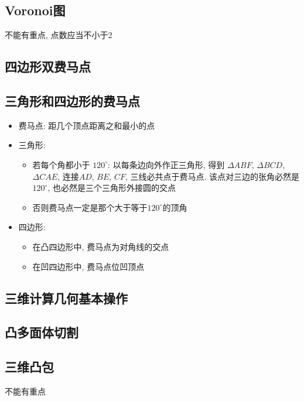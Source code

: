 \documentclass[landscape, twocolumn, 8pt, a4paper, twoside]{extarticle}
\begin{document}
  \subsection{Voronoi图}
  不能有重点, 点数应当不小于2
  

  \subsection{四边形双费马点}
  

  \subsection{三角形和四边形的费马点}
  \begin{itemize}
  \item 费马点: 距几个顶点距离之和最小的点
  \item 三角形:
      \begin{itemize}
      \item 若每个角都小于 $120^{\circ}$: 以每条边向外作正三角形, 得到 $\Delta ABF$, $\Delta BCD$, $\Delta CAE$, 连接$AD$, $BE$, $CF$, 三线必共点于费马点. 该点对三边的张角必然是$120^{\circ}$, 也必然是三个三角形外接圆的交点
      \item 否则费马点一定是那个大于等于$120^{\circ}$的顶角
      \end{itemize}
  \item 四边形:
      \begin{itemize}
        \item 在凸四边形中, 费马点为对角线的交点
        \item 在凹四边形中, 费马点位凹顶点
      \end{itemize}
  \end{itemize}

  \subsection{三维计算几何基本操作}
  

  \subsection{凸多面体切割}
  

  \subsection{三维凸包}
  不能有重点
  
\end{document}
